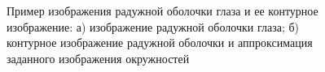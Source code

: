 \begin{figure}[h!]
\center
\caption{Пример изображения радужной оболочки глаза и ее контурное изображение: а) изображение радужной оболочки глаза; б) контурное изображение радужной оболочки и аппроксимация заданного изображения окружностей}
\label{intro:fig1}
\end{figure}

